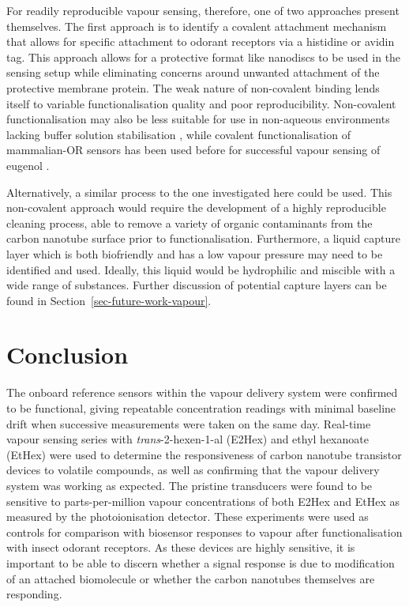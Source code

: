 \documentclass[
  a4paper,
]{scrbook}
\begin{document}
For readily reproducible vapour sensing, therefore, one of two
approaches present themselves. The first approach is to identify a
covalent attachment mechanism that allows for specific attachment to
odorant receptors via a histidine or avidin tag. This approach allows
for a protective format like nanodiscs to be used in the sensing setup
while eliminating concerns around unwanted attachment of the protective
membrane protein. The weak nature of non-covalent binding lends itself
to variable functionalisation quality and poor reproducibility.
Non-covalent functionalisation may also be less suitable for use in
non-aqueous environments lacking buffer solution stabilisation
\autocite{Li2023}, while covalent functionalisation of mammalian-OR
sensors has been used before for successful vapour sensing of eugenol
\autocite{Goldsmith2011}.

Alternatively, a similar process to the one investigated here could be
used. This non-covalent approach would require the development of a
highly reproducible cleaning process, able to remove a variety of
organic contaminants from the carbon nanotube surface prior to
functionalisation. Furthermore, a liquid capture layer which is both
biofriendly and has a low vapour pressure may need to be identified and
used. Ideally, this liquid would be hydrophilic and miscible with a wide
range of substances. Further discussion of potential capture layers can
be found in Section~\ref{sec-future-work-vapour}.

\hypertarget{conclusion-3}{%
\section{Conclusion}\label{conclusion-3}}

The onboard reference sensors within the vapour delivery system were
confirmed to be functional, giving repeatable concentration readings
with minimal baseline drift when successive measurements were taken on
the same day. Real-time vapour sensing series with
\emph{trans}-2-hexen-1-al (E2Hex) and ethyl hexanoate (EtHex) were used
to determine the responsiveness of carbon nanotube transistor devices to
volatile compounds, as well as confirming that the vapour delivery
system was working as expected. The pristine transducers were found to
be sensitive to parts-per-million vapour concentrations of both E2Hex
and EtHex as measured by the photoionisation detector. These experiments
were used as controls for comparison with biosensor responses to vapour
after functionalisation with insect odorant receptors. As these devices
are highly sensitive, it is important to be able to discern whether a
signal response is due to modification of an attached biomolecule or
whether the carbon nanotubes themselves are responding.
\end{document}
